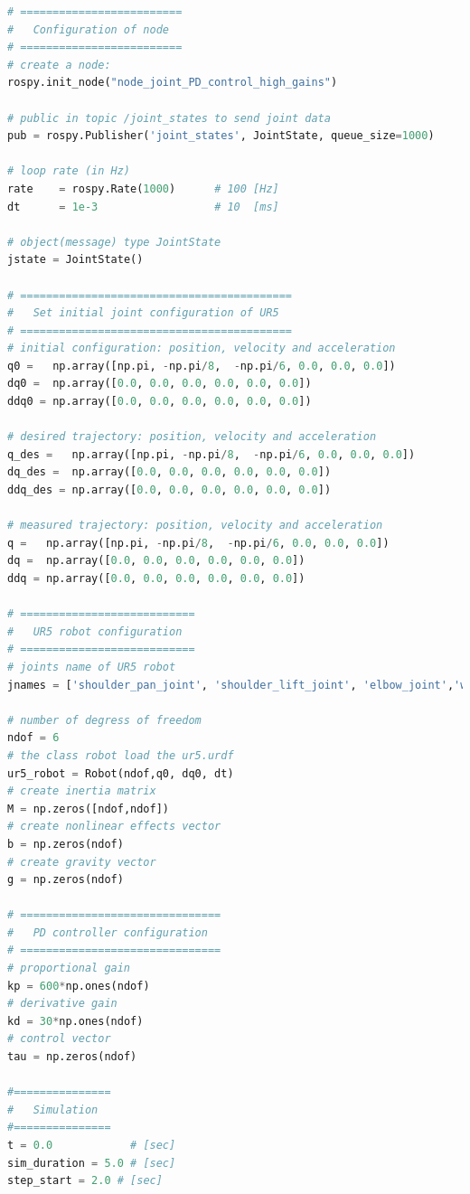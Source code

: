 \begin{lstlisting}[language=Python,caption={Rosnode to move the second and fifth joint of UR5 robot with the requirement motion of activity 1.4.}, label={lst:joint_PD_control_high_gains}]
# =========================
#   Configuration of node
# =========================
# create a node: 
rospy.init_node("node_joint_PD_control_high_gains")

# public in topic /joint_states	to send joint data	
pub = rospy.Publisher('joint_states', JointState, queue_size=1000)

# loop rate (in Hz)
rate 	= rospy.Rate(1000)		# 100 [Hz]
dt 		= 1e-3					# 10  [ms]

# object(message) type JointState
jstate = JointState()

# ==========================================
#   Set initial joint configuration of UR5
# ==========================================
# initial configuration: position, velocity and acceleration 
q0 =   np.array([np.pi, -np.pi/8,  -np.pi/6, 0.0, 0.0, 0.0])
dq0 =  np.array([0.0, 0.0, 0.0, 0.0, 0.0, 0.0]) 
ddq0 = np.array([0.0, 0.0, 0.0, 0.0, 0.0, 0.0]) 

# desired trajectory: position, velocity and acceleration
q_des =   np.array([np.pi, -np.pi/8,  -np.pi/6, 0.0, 0.0, 0.0]) 
dq_des =  np.array([0.0, 0.0, 0.0, 0.0, 0.0, 0.0]) 
ddq_des = np.array([0.0, 0.0, 0.0, 0.0, 0.0, 0.0]) 

# measured trajectory: position, velocity and acceleration
q =   np.array([np.pi, -np.pi/8,  -np.pi/6, 0.0, 0.0, 0.0])
dq =  np.array([0.0, 0.0, 0.0, 0.0, 0.0, 0.0]) 
ddq = np.array([0.0, 0.0, 0.0, 0.0, 0.0, 0.0]) 

# ===========================
#   UR5 robot configuration
# ===========================
# joints name of UR5 robot
jnames = ['shoulder_pan_joint', 'shoulder_lift_joint', 'elbow_joint','wrist_1_joint', 'wrist_2_joint', 'wrist_3_joint']

# number of degress of freedom
ndof = 6
# the class robot load the ur5.urdf
ur5_robot = Robot(ndof,q0, dq0, dt)
# create inertia matrix 
M = np.zeros([ndof,ndof])
# create nonlinear effects vector
b = np.zeros(ndof)
# create gravity vector
g = np.zeros(ndof)

# ===============================
#   PD controller configuration
# ===============================
# proportional gain
kp = 600*np.ones(ndof)
# derivative gain
kd = 30*np.ones(ndof)
# control vector
tau = np.zeros(ndof)    

#===============
#   Simulation
#===============
t = 0.0            # [sec] 
sim_duration = 5.0 # [sec]
step_start = 2.0 # [sec]


\end{lstlisting}
